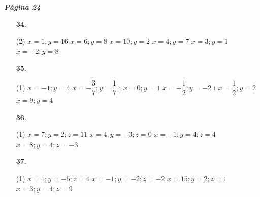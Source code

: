 \documentclass[a4paper, pdf, twoside]{book}
\begin{document}
\begin{multicols}{2}
{\textbf{\em Pàgina 24}} \hrulefill
\begin{enumerate}
\vspace{0.25cm}



 \item[\fontfamily{phv}\selectfont\color{blue}\textbf{34}. ]  \scalebox{0.6}{\simbolclau } 
 \begin{tasks}[column-sep=1em, item-indent=1.3333em](2)
	 \task  $x=1; y=16$
	 \task $x=6; y=8$
	 \task $x=10; y=2$
	 \task $x=4; y=7$
	 \task $x=3; y=1$
	 \task $x=-2; y=8$ 
\end{tasks}
 \end{enumerate}
\begin{enumerate}
\vspace{0.25cm}



 \item[\fontfamily{phv}\selectfont\color{blue}\textbf{35}. ] 
 \begin{tasks}[column-sep=1em, item-indent=1.3333em](1)
	 \task  $x=-1; y=4$
	 \task* $x=-\dfrac {3}{7}; y=\dfrac {1}{7}$ i $x=0; y=1$
	 \task* $x=-\dfrac {1}{2}; y=-2$ i $x=\dfrac {1}{2}; y=2$
	 \task $x=9; y=4$ 
\end{tasks}
\vspace{0.25cm}



 \item[\fontfamily{phv}\selectfont\color{blue}\textbf{36}. ]  \scalebox{0.6}{\simbolclau } 
 \begin{tasks}[column-sep=1em, item-indent=1.3333em](1)
	 \task  $x=7; y=2; z=11$
	 \task $x=4; y=-3; z=0$
	 \task $x=-1; y=4; z=4$
	 \task $x=8; y=4; z=-3$ 
\end{tasks}
\vspace{0.25cm}



 \item[\fontfamily{phv}\selectfont\color{blue}\textbf{37}. ]  \scalebox{0.6}{\simbolclau } 
 \begin{tasks}[column-sep=1em, item-indent=1.3333em](1)
	 \task  $x=1; y=-5; z=4$
	 \task $x=-1; y=-2; z=-2$
	 \task $x=15; y=2; z=1$
	 \task $x=3; y=4; z=9$ 
\end{tasks}
 \end{enumerate}
\vspace{0.3cm}


\end{multicols}
\end{document}
